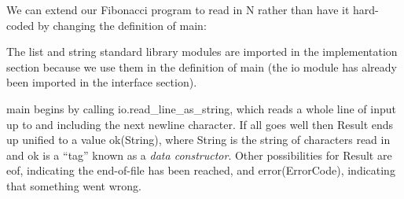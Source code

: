 \documentclass[a4paper,11pt,notitlepage,onecolumn]{book}
\begin{document}
We can extend our Fibonacci program to read in \textsf{N} rather than have it
hard-coded by changing the definition of \textsf{main}:
\begin{small}

\begin{ptabular}
\nextline
\nextline
{}
\nextline
{}
\nextline
{}
\nextline
{}
\nextline
{}
\nextline
{}
\nextline
{}
\nextline
{}
\nextline
{}
\nextline
{}
\nextline
\end{ptabular}

\end{small}
The \textsf{list} and \textsf{string} standard library modules are imported in the
implementation section because we use them in the definition of \textsf{main} (the
\textsf{io} module has already been imported in the interface section).

\textsf{main} begins by calling \textsf{io.read\_line\_as\_string}, which reads a whole line
of input up to and including the next newline character.  If all goes well
then \textsf{Result} ends up unified to a value \textsf{ok(String)}, where \textsf{String} is the
string of characters read in and \textsf{ok} is a ``tag'' known as a \emph{data
constructor}.
Other possibilities for \textsf{Result} are \textsf{eof}, indicating the end-of-file has
been reached, and \textsf{error(ErrorCode)}, indicating that something went wrong.
\end{document}
